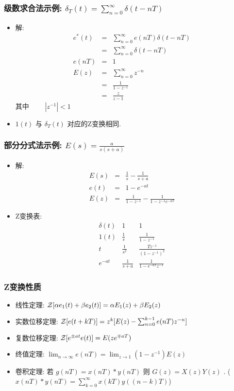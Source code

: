 \documentclass[table]{beamer}
\begin{document}
\begin{frame}
\frametitle{级数求合法示例: $\delta_T(t)=\sum_{n=0}^{\infty}\delta(t-nT)$}
\label{sec-1-4}

\begin{itemize}
\item <2->解:
     \begin{eqnarray*}
     e^*(t) & = & \sum_{n=0}^{\infty}e(nT)\delta(t-nT) \\
      &=& \sum_{n=0}^{\infty}\delta(t-nT) \\
     e(nT) &=& 1\\
     E(z) &=& \sum_{n=0}^{\infty}z^{-n}\\
      &=& \frac{1}{1-z^{-1}} \\
     &=& \frac{z}{z-1}
     \end{eqnarray*}
     其中 $\qquad |z^{-1}|<1$
\item <3->$1(t)$  与  $\delta_T(t)$  对应的Z变换相同.
\end{itemize}
\end{frame}
\begin{frame}
\frametitle{部分分式法示例:  $E(s)=\frac{a}{s(s+a)}$}
\label{sec-1-5}

\begin{itemize}
\item <2->解:
     \begin{eqnarray*}
     E(s) & = & \frac{1}{s}-\frac{1}{s+a}\\
     e(t) &=& 1-e^{-at} \\
     E(z) &=& \frac{1}{1-z^{-1}} -\frac{1}{1-z^{-1}e^{-aT}}
     \end{eqnarray*}
\item <3->Z变换表:
     \[\begin{matrix}
     \delta(t) & 1 & 1 \\
     1(t) & \frac{1}{s} & \frac{1}{1-z^{-1}} \\
     t & \frac{1}{s^2} & \frac{Tz^{-1}}{(1-z^{-1})^2} \\
     e^{-at} & \frac{1}{s+a} &\frac{1}{1-e^{-aT}z^{-1}}
     \end{matrix}\]
\end{itemize}
\end{frame}
\begin{frame}
\frametitle{Z变换性质}
\label{sec-1-6}

\begin{itemize}
\item <2->线性定理:    ${\cal Z}[\alpha e_1(t)+\beta e_2(t)]=\alpha E_1(z)+\beta E_2(z)$
\item <3->实数位移定理:  ${\cal Z}[e(t+kT)] = z^k[E(z)-\sum_{n=0}^{k-1}e(nT)z^{-n}]$
\item <4->复数位移定理:  ${\cal Z}[e^{\pm at}e(t)] = E(ze^{\mp aT})$
\item <5->终值定理:  $\lim_{n\rightarrow\infty}e(nT)=\lim_{z\rightarrow 1}(1-z^{-1})E(z)$
\item <6->卷积定理: 若  $g(nT)=x(nT)*y(nT)$  则  $G(z)=X(z)Y(z)$  . ($x(nT)*y(nT)=\sum_{k=0}^{\infty}x(kT)y((n-k)T)$)
\end{itemize}
\end{frame}
\end{document}
